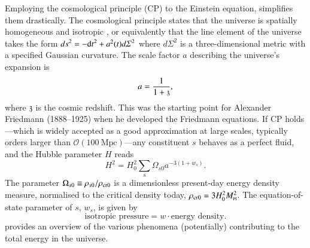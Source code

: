 




\newcommand*\pert{\ALIASpert}







Employing the cosmological principle (CP) to the Einstein equation, simplifies them drastically. The cosmological principle states that the universe is spatially homogeneous and isotropic%
, %
or equivalently that the line element of the universe takes the form 
${ds}^2 = -{\diff t}^2 + a^2(t){d\varSigma}^2$ where ${d\varSigma}^2$
is a three-dimensional metric with a specified Gaussian curvature. The scale factor $a$ describing the universe's expansion is %
\begin{equation}
    a = \frac{1}{1+\mathfrak{z}},
\end{equation}
where $\mathfrak{z}$ is the cosmic redshift. %
This was the starting point for Alexander Friedmann (1888--1925) when he developed the Friedmann equations. If CP holds---which is widely accepted as a good approximation at large scales, typically orders larger than $\mathscr{O}(100~\mathrm{Mpc})$---any constituent $s$ behaves as a perfect fluid, and the Hubble parameter $H$ reads %
\begin{equation}\label{eq:GR:lcdm:first_Friedmann}
    H^2 = H_0^2 \sum_s \Omega_{s0} a^{-3(1+w_s)}.
\end{equation}
The parameter $\Omega_{s0}\equiv \rho_{s0}/\rho_\mathrm{cr0}$ is a dimensionless present-day energy density measure, normalised to the critical density today, $\rho_\mathrm{cr0}= 3H_0^2 M_{\text{\tiny{Pl}}}^2$. %
The equation-of-state parameter of $s$, $w_s$, is given by
\[\text{isotropic pressure} = w \cdot \text{energy density}.\] %
 provides an overview of the various phenomena (potentially) contributing to the total energy in the universe.

